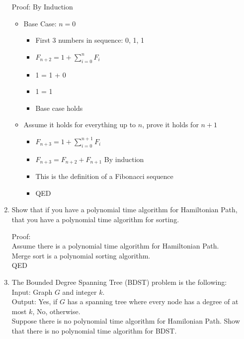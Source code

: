 \documentclass[12pt]{article}
\begin{document}
\begin{enumerate}
    Proof: By Induction\\
    \begin{itemize}
        \item Base Case: $n=0$
        \begin{itemize}
            \item First 3 numbers in sequence: 0, 1, 1
            \item $F_{n+2} = 1 + \sum_{i=0}^n F_i$
            \item 1 = 1 + 0
            \item 1 = 1
            \item Base case holds
        \end{itemize}
        \item Assume it holds for everything up to $n$, prove it holds for $n+1$
        \begin{itemize}
            \item $F_{n+3} = 1 + \sum_{i=0}^{n+1} F_i$
            \item $F_{n+3} = F_{n+2} + F_{n+1}$ By induction
            \item This is the definition of a Fibonacci sequence
            \item QED
        \end{itemize}
    \end{itemize}

\item Show that if you have a polynomial time algorithm for Hamiltonian Path,
    that you have a polynomial time algorithm for sorting.

    Proof:\\
    Assume there is a polynomial time algorithm for Hamiltonian Path.\\
    Merge sort is a polynomial sorting algorithm.\\
    QED

\item The Bounded Degree Spanning Tree (BDST) problem is the following:\\
    Input: Graph $G$ and integer $k$.\\
    Output: Yes, if $G$ has a spanning tree where every node has a degree of at
    most $k$, No, otherwise.\\
    Suppose there is no polynomial time algorithm for Hamilonian Path. Show that
    there is no polynomial time algorithm for BDST.

\end{enumerate}
\end{document}
